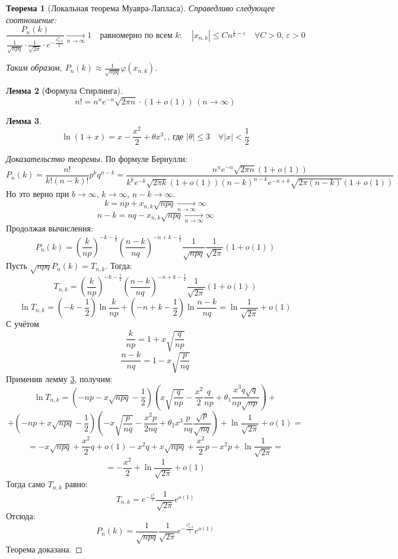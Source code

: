 \documentclass[11pt,openany,a4paper]{scrartcl}
\theoremstyle{plain}
\newtheorem{theorem}{Теорема}[section]
\newtheorem{lemma}[theorem]{Лемма}
\theoremstyle{definition}
\newcommand{\underto}[1]{\xrightarrow[#1]{}}
\begin{document}
\begin{theorem}[Локальная теорема Муавра-Лапласа]
    Справедливо следующее соотношение:
    $$
    \frac{P_n(k)}{\frac{1}{\sqrt{npq}}\cdot \frac{1}{\sqrt{2\pi}}\cdot
    e^{-\frac{x_{n,k}^2}{2}}} \underto{n \to \infty} 1\quad \text{равномерно по всем } k:\quad
    |x_{n,k}|\leqslant Cn^{\frac{1}{6}-\varepsilon}\quad \forall C>0,\, \varepsilon > 0
    $$
    
    Таким образом, $P_n(k) \approx \frac{1}{\sqrt{npq}}\varphi(x_{n,k})$.
\end{theorem}
\begin{lemma}[Формула Стирлинга]
    $$
    n! = n^n e^{-n} \sqrt{2\pi n}\cdot(1 + o(1))\, (n \to \infty)
    $$
\end{lemma}
\begin{lemma}\label{laplacetheoremlemma2}
    $$
    \ln(1+x) = x - \frac{x^2}{2} + \theta x^3,\text{, где } |\theta| \leqslant 3
    \quad\forall |x| < \frac{1}{2}
    $$
\end{lemma}
\begin{proof}[Доказательство теоремы]
    По формуле Бернулли:
    $$
    P_n(k) = \frac{n!}{k!(n-k)!}p^k q^{n-k} =
    \frac{n^n e^{-n}\sqrt{2\pi n} (1 + o(1))}{k^k e^{-k} \sqrt{2\pi k} (1 + o(1))
    (n-k)^{n-k} e^{-n+k}\sqrt{2\pi (n-k)}(1 + o(1))}
    $$
    Но это верно при $b \to \infty$, $k \to \infty$, $n-k \to \infty$.
    $$
    k = np + x_{n,k}\sqrt{npq} \underto{n \to \infty} \infty
    $$
    $$
    n-k = nq - x_{n,k}\sqrt{npq} \underto{n \to \infty} \infty
    $$
    Продолжая вычисления:
    $$
    P_n(k) = (\frac{k}{np})^{-k-\frac{1}{2}}(\frac{n-k}{nq})^{-n+k-\frac{1}{2}}
    \frac{1}{\sqrt{npq}}\frac{1}{\sqrt{2\pi}}(1 + o(1))
    $$
    Пусть $\sqrt{npq}P_n(k) = T_{n,k}$. Тогда:
    $$
    T_{n,k} = (\frac{k}{np})^{-k-\frac{1}{2}}(\frac{n-k}{nq})^{-n+k-\frac{1}{2}}
    \frac{1}{\sqrt{2\pi}}(1 + o(1))
    $$
    $$
    \ln T_{n,k} = (-k - \frac{1}{2})\ln \frac{k}{np} + (-n+k-\frac{1}{2})
    \ln \frac{n-k}{nq} = \ln \frac{1}{\sqrt{2\pi}} + o(1)
    $$
    С учётом
    $$
    \frac{k}{np} = 1 + x\sqrt{\frac{q}{np}}
    $$
    $$
    \frac{n-k}{nq} = 1 - x\sqrt{\frac{p}{nq}}
    $$
    Применив лемму \ref{laplacetheoremlemma2}, получим:
    $$
    \ln T_{n,k} = (-np - x\sqrt{npq} - \frac{1}{2})(x\sqrt{\frac{q}{np}} -
    \frac{x^2}{2}\frac{q}{np} + \theta_1 \frac{x^3 q\sqrt{q}}{np\sqrt{np}}) +
    $$
    $$
    + (-np + x\sqrt{npq} - \frac{1}{2})(-x\sqrt{\frac{p}{nq}} -
    \frac{x^2p}{2nq} + \theta_2x^3\frac{p}{nq}\frac{\sqrt{p}}{\sqrt{nq}}) +
    \ln \frac{1}{\sqrt{2\pi}} + o(1) =
    $$
    $$
    = -x\sqrt{npq} + \frac{x^2}{2}q + o(1) - x^2q + x\sqrt{npq} + \frac{x^2}{2}p
    - x^2p + \ln \frac{1}{\sqrt{2\pi}} =
    $$
    $$
    =-\frac{x^2}{2} + \ln \frac{1}{\sqrt{2\pi}} + o(1) 
    $$
    Тогда само $T_{n,k}$ равно:
    $$
    T_{n,k} = e^{-\frac{x^2}{2}} \frac{1}{\sqrt{2\pi}} e^{o(1)}
    $$
    Отсюда:
    $$
    P_n(k) = \frac{1}{\sqrt{npq}}\frac{1}{\sqrt{2\pi}}e^{-\frac{x^2_{n,k}}{2}}
    e^{o(1)}
    $$
    Теорема доказана.
\end{proof}
\end{document}
